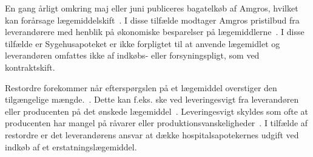 En gang årligt omkring maj eller juni publiceres bagatelkøb af Amgros, hvilket kan forårsage lægemiddelskift~\citep{Amgros2018}. I disse tilfælde modtager Amgros pristilbud fra leverandørere med henblik på økonomiske besparelser på lægemiddlerne~\citep{Amgros2012}. I disse tilfælde er Sygehusapoteket er ikke forpligtet til at anvende lægemidlet og leverandøren omfattes ikke af indkøbs- eller forsyningspligt, som ved kontraktskift.~\citep{Amgros2018}

Restordre forekommer når efterspørgslen på et lægemiddel overstiger den tilgængelige mængde.~\citep{Amgros2015}. Dette kan f.eks. ske ved leveringesvigt fra leverandøren eller producenten på det ønskede lægemiddel~\citep{Amgros2017, Laegemiddelinformaion2017}. Leveringesvigt skyldes som ofte at producenten har mangel på råvarer eller produktionsvanskeligheder~\citep{Amgros2017, Laegemiddelinformaion2017}. I tilfælde  af restordre er det leverandørens ansvar at dække hospitalsapotekernes udgift ved indkøb af et erstatningslægemiddel.